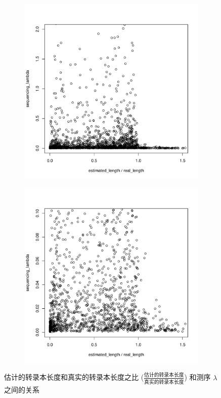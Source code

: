 \begin{figure}[!t]
\centering

    \begin{subfigure}{\textwidth}
        \centering
        \includegraphics[width=0.45\textheight]{figures/lenest/lambda-len_ratio-2.pdf}
    \end{subfigure}
    
    \begin{subfigure}{\textwidth}
        \centering
        \includegraphics[width=0.45\textheight]{figures/lenest/lambda-len_ratio-0_10.pdf}
    \end{subfigure}


\caption{估计的转录本长度和真实的转录本长度之比 
($\frac{\text{估计的转录本长度}}{\text{真实的转录本长度}}$) 
和测序 $\lambda$ 
之间的关系}
\label{len-ratio-VS-lambda}
\end{figure}



